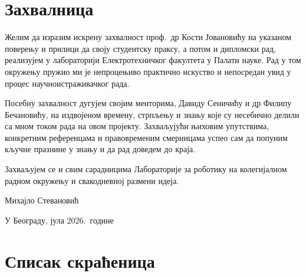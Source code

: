 \documentclass[12pt, a4paper]{article}
\begin{document}
\clearpage

\section*{Захвалница}

Желим да изразим искрену захвалност проф.\ др Кости Јовановићу на указаном поверењу и прилици да своју студентску праксу, а потом и дипломски рад, реализујем у лабораторији Електротехничког факултета у Палати науке.
Рад у том окружењу пружио ми је непроцењиво практично искуство и непосредан увид у процес научноистраживачког рада.

Посебну захвалност дугујем својим менторима, Давиду Сеничићу и др Филипу Бечановићу, на издвојеном времену, стрпљењу и знању које су несебично делили са мном током рада на овом пројекту.
Захваљујући њиховим упутствима, конкретним референцама и правовременим смерницама успео сам да попуним кључне празнине у знању и да рад доведем до краја.

Захваљујем се и свим сарадницима Лабораторије за роботику на колегијалном радном окружењу и свакодневној размени идеја.

\vspace{1.5cm}
\noindent Михајло Стевановић

\noindent У Београду, јула 2026.\ године

\clearpage

\tableofcontents

\clearpage
{}
\section*{Списак скраћеница}
\end{document}
